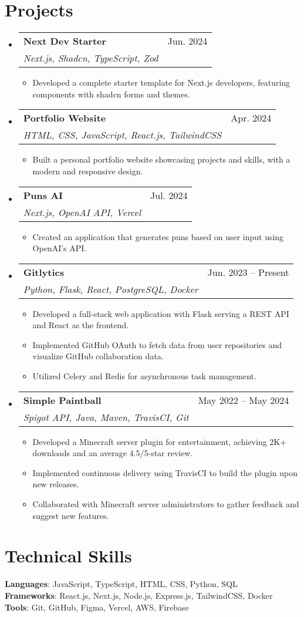 \documentclass[letterpaper,11pt]{article}
\makeatletter
\newcommand{\resumeSubheading}[4]{
  \vspace{-2pt}\item
    \begin{tabular*}{\textwidth}{l@{\extracolsep{\fill}}r}
      \textbf{#1} & #2 \\
      \textit{\small#3} & \textit{\small #4} \\
    \end{tabular*}\vspace{-7pt}
}
\newcommand{\resumeSubItem}[1]{\item\small{#1 \vspace{-2pt}}}
\newcommand{\resumeSubHeadingListStart}{\begin{itemize}[leftmargin=0.15in, label={}]}
\newcommand{\resumeSubHeadingListEnd}{\end{itemize}}
\newcommand{\resumeItemListStart}{\begin{itemize}}
\newcommand{\resumeItemListEnd}{\end{itemize}\vspace{-5pt}}
\makeatother
\begin{document}
\section{Projects}
    \resumeSubHeadingListStart
      \resumeSubheading
          {Next Dev Starter}{Jun. 2024}{\emph{Next.js, Shadcn, TypeScript, Zod}}{}
          \resumeItemListStart
            \resumeSubItem{Developed a complete starter template for Next.js developers, featuring components with shadcn forms and themes.}
          \resumeItemListEnd
      \resumeSubheading
          {Portfolio Website}{Apr. 2024}{\emph{HTML, CSS, JavaScript, React.js, TailwindCSS}}{}
          \resumeItemListStart
            \resumeSubItem{Built a personal portfolio website showcasing projects and skills, with a modern and responsive design.}
          \resumeItemListEnd
      \resumeSubheading
          {Puns AI}{Jul. 2024}{\emph{Next.js, OpenAI API, Vercel}}{}
          \resumeItemListStart
            \resumeSubItem{Created an application that generates puns based on user input using OpenAI's API.}
          \resumeItemListEnd
      \resumeSubheading
          {Gitlytics}{Jun. 2023 -- Present}{\emph{Python, Flask, React, PostgreSQL, Docker}}{}
          \resumeItemListStart
            \resumeSubItem{Developed a full-stack web application with Flask serving a REST API and React as the frontend.}
            \resumeSubItem{Implemented GitHub OAuth to fetch data from user repositories and visualize GitHub collaboration data.}
            \resumeSubItem{Utilized Celery and Redis for asynchronous task management.}
          \resumeItemListEnd
      \resumeSubheading
          {Simple Paintball}{May 2022 -- May 2024}{\emph{Spigot API, Java, Maven, TravisCI, Git}}{}
          \resumeItemListStart
            \resumeSubItem{Developed a Minecraft server plugin for entertainment, achieving 2K+ downloads and an average 4.5/5-star review.}
            \resumeSubItem{Implemented continuous delivery using TravisCI to build the plugin upon new releases.}
            \resumeSubItem{Collaborated with Minecraft server administrators to gather feedback and suggest new features.}
          \resumeItemListEnd
    \resumeSubHeadingListEnd

\section{Technical Skills}
 \begin{itemize}[leftmargin=0.15in, label={}]
    \small{\item{
     \textbf{Languages}{: JavaScript, TypeScript, HTML, CSS, Python, SQL} \\
     \textbf{Frameworks}{: React.js, Next.js, Node.js, Express.js, TailwindCSS, Docker} \\
     \textbf{Tools}{: Git, GitHub, Figma, Vercel, AWS, Firebase} \\
    }}
 \end{itemize}

\end{document}
